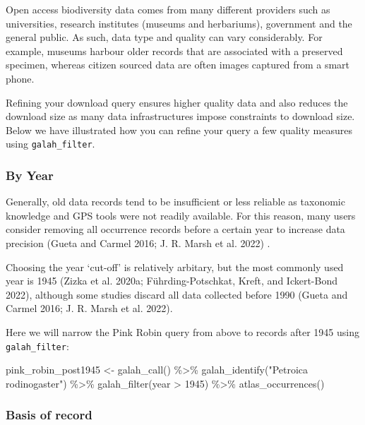 \documentclass[
  letterpaper,
  DIV=11,
  numbers=noendperiod,
  oneside]{scrreprt}
\newenvironment{Shaded}{\begin{snugshade}}{\end{snugshade}}
\newcommand{\DecValTok}[1]{\textcolor[rgb]{0.68,0.00,0.00}{#1}}
\newcommand{\FunctionTok}[1]{\textcolor[rgb]{0.28,0.35,0.67}{#1}}
\newcommand{\NormalTok}[1]{\textcolor[rgb]{0.00,0.23,0.31}{#1}}
\newcommand{\OtherTok}[1]{\textcolor[rgb]{0.00,0.23,0.31}{#1}}
\newcommand{\SpecialCharTok}[1]{\textcolor[rgb]{0.37,0.37,0.37}{#1}}
\newcommand{\StringTok}[1]{\textcolor[rgb]{0.13,0.47,0.30}{#1}}
\begin{document}
Open access biodiversity data comes from many different providers such
as universities, research institutes (museums and herbariums),
government and the general public. As such, data type and quality can
vary considerably. For example, museums harbour older records that are
associated with a preserved specimen, whereas citizen sourced data are
often images captured from a smart phone.

Refining your download query ensures higher quality data and also
reduces the download size as many data infrastructures impose
constraints to download size. Below we have illustrated how you can
refine your query a few quality measures using \texttt{galah\_filter}.

\hypertarget{by-year}{%
\subsubsection{By Year}\label{by-year}}

Generally, old data records tend to be insufficient or less reliable as
taxonomic knowledge and GPS tools were not readily available. For this
reason, many users consider removing all occurrence records before a
certain year to increase data precision (Gueta and Carmel 2016; J. R.
Marsh et al. 2022) .

Choosing the year `cut-off' is relatively arbitary, but the most
commonly used year is 1945 (Zizka et al. 2020a; Führding-Potschkat,
Kreft, and Ickert-Bond 2022), although some studies discard all data
collected before 1990 (Gueta and Carmel 2016; J. R. Marsh et al. 2022).

Here we will narrow the Pink Robin query from above to records after
1945 using \texttt{galah\_filter}:

\begin{Shaded}
\begin{Highlighting}[]
\NormalTok{pink\_robin\_post1945 }\OtherTok{\textless{}{-}} \FunctionTok{galah\_call}\NormalTok{() }\SpecialCharTok{\%\textgreater{}\%} 
  \FunctionTok{galah\_identify}\NormalTok{(}\StringTok{"Petroica rodinogaster"}\NormalTok{) }\SpecialCharTok{\%\textgreater{}\%} 
  \FunctionTok{galah\_filter}\NormalTok{(year }\SpecialCharTok{\textgreater{}} \DecValTok{1945}\NormalTok{) }\SpecialCharTok{\%\textgreater{}\%} 
  \FunctionTok{atlas\_occurrences}\NormalTok{()}
\end{Highlighting}
\end{Shaded}

\hypertarget{basis-of-record}{%
\subsubsection{Basis of record}\label{basis-of-record}}
\end{document}
